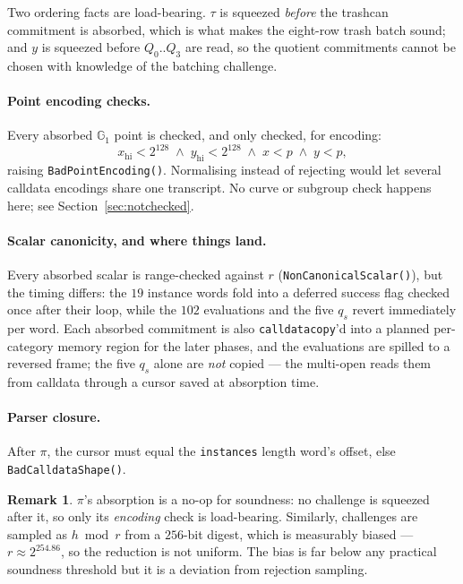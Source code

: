 \documentclass[11pt,a4paper]{article}
\newcommand{\Gone}{\ensuremath{\mathbb{G}_{1}}}
\newcommand{\code}[1]{\texttt{#1}}
\newcommand{\err}[1]{\textcolor{red!60!black}{\texttt{#1}}}
\theoremstyle{definition}
\newtheorem{remark}{Remark}[section]
\begin{document}
Two ordering facts are load-bearing. $\tau$ is squeezed \emph{before} the
trashcan commitment is absorbed, which is what makes the eight-row trash batch
sound; and $y$ is squeezed before $Q_0..Q_3$ are read, so the quotient
commitments cannot be chosen with knowledge of the batching challenge.

\paragraph{Point encoding checks.}
Every absorbed $\Gone$ point is checked, and only checked, for encoding:
\begin{equation}
x_{\mathrm{hi}} < 2^{128} \;\wedge\; y_{\mathrm{hi}} < 2^{128}
\;\wedge\;
x < p \;\wedge\; y < p,
\end{equation}
raising \err{BadPointEncoding()}. Normalising instead of rejecting would let
several calldata encodings share one transcript. No curve or subgroup check
happens here; see Section~\ref{sec:notchecked}.

\paragraph{Scalar canonicity, and where things land.}
Every absorbed scalar is range-checked against $r$
(\err{NonCanonicalScalar()}), but the timing differs: the $19$ instance words
fold into a deferred success flag checked once after their loop, while the
$102$ evaluations and the five $q_s$ revert immediately per word. Each
absorbed commitment is also \code{calldatacopy}'d into a planned per-category
memory region for the later phases, and the evaluations are spilled to a
reversed frame; the five $q_s$ alone are \emph{not} copied --- the multi-open
reads them from calldata through a cursor saved at absorption time.

\paragraph{Parser closure.}
After $\pi$, the cursor must equal the \code{instances} length word's offset,
else \err{BadCalldataShape()}.

\begin{remark}
$\pi$'s absorption is a no-op for soundness: no challenge is squeezed after it,
so only its \emph{encoding} check is load-bearing. Similarly, challenges are
sampled as $h \bmod r$ from a $256$-bit digest, which is measurably biased ---
$r \approx 2^{254.86}$, so the reduction is not uniform. The bias is far below
any practical soundness threshold but it is a deviation from rejection
sampling.
\end{remark}
\end{document}
